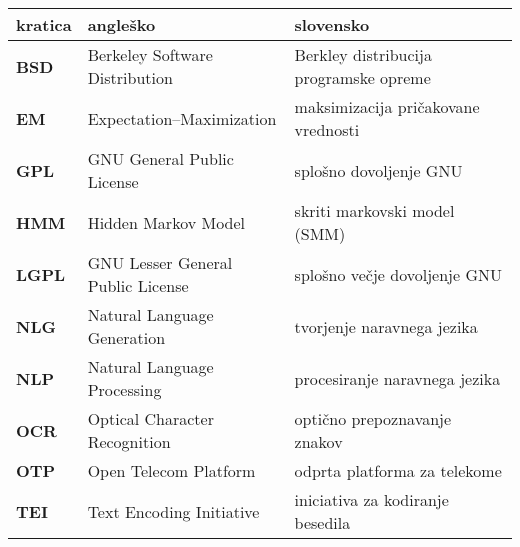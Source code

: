 \hspace*{-1.5cm}
\begin{tabular}{l|l|l}
  {\bf kratica} & {\bf angleško} & {\bf slovensko} \\
  \hline
  {\bf BSD}  & Berkeley Software Distribution & Berkley distribucija programske opreme \\
  {\bf EM}   & Expectation–Maximization & maksimizacija pričakovane vrednosti \\
  {\bf GPL}  & GNU General Public License & splošno dovoljenje GNU \\
  {\bf HMM}  & Hidden Markov Model & skriti markovski model (SMM) \\
  {\bf LGPL} & GNU Lesser General Public License & splošno večje dovoljenje GNU \\
  {\bf NLG}  & Natural Language Generation & tvorjenje naravnega jezika \\
  {\bf NLP}  & Natural Language Processing & procesiranje naravnega jezika \\
  {\bf OCR}  & Optical Character Recognition & optično prepoznavanje znakov \\
  {\bf OTP}  & Open Telecom Platform & odprta platforma za telekome \\
  {\bf TEI}  & Text Encoding Initiative & iniciativa za kodiranje besedila \\
\end{tabular}
